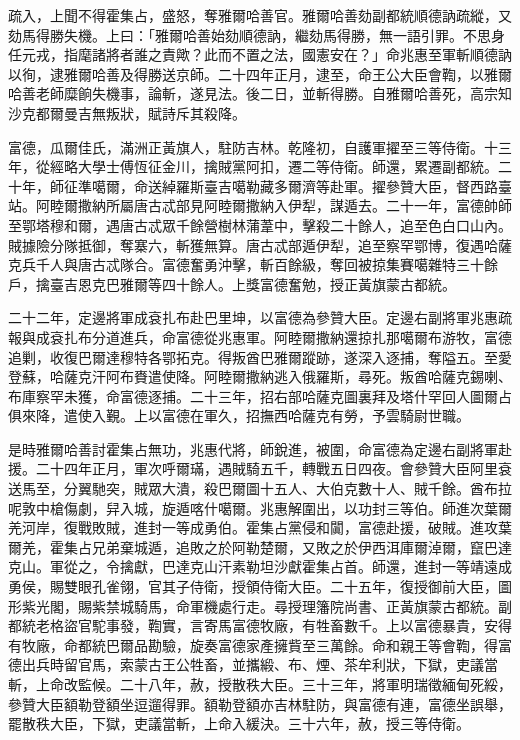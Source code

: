 \begin{pinyinscope}
疏入，上聞不得霍集占，盛怒，奪雅爾哈善官。雅爾哈善劾副都統順德訥疏縱，又劾馬得勝失機。上曰：「雅爾哈善始劾順德訥，繼劾馬得勝，無一語引罪。不思身任元戎，指麾諸將者誰之責歟？此而不置之法，國憲安在？」命兆惠至軍斬順德訥以徇，逮雅爾哈善及得勝送京師。二十四年正月，逮至，命王公大臣會鞫，以雅爾哈善老師糜餉失機事，論斬，遂見法。後二日，並斬得勝。自雅爾哈善死，高宗知沙克都爾曼吉無叛狀，賦詩斥其殺降。

富德，瓜爾佳氏，滿洲正黃旗人，駐防吉林。乾隆初，自護軍擢至三等侍衛。十三年，從經略大學士傅恆征金川，擒賊黨阿扣，遷二等侍衛。師還，累遷副都統。二十年，師征準噶爾，命送綽羅斯臺吉噶勒藏多爾濟等赴軍。擢參贊大臣，督西路臺站。阿睦爾撒納所屬唐古忒部見阿睦爾撒納入伊犁，謀遁去。二十一年，富德帥師至鄂塔穆和爾，遇唐古忒眾千餘營樹林蒲葦中，擊殺二十餘人，追至色白口山內。賊據險分隊抵御，奪寨六，斬獲無算。唐古忒部遁伊犁，追至察罕鄂博，復遇哈薩克兵千人與唐古忒隊合。富德奮勇沖擊，斬百餘級，奪回被掠集賽噶雜特三十餘戶，擒臺吉恩克巴雅爾等四十餘人。上獎富德奮勉，授正黃旗蒙古都統。

二十二年，定邊將軍成袞扎布赴巴里坤，以富德為參贊大臣。定邊右副將軍兆惠疏報與成袞扎布分道進兵，命富德從兆惠軍。阿睦爾撒納還掠扎那噶爾布游牧，富德追剿，收復巴爾達穆特各鄂拓克。得叛酋巴雅爾蹤跡，遂深入逐捕，奪隘五。至愛登蘇，哈薩克汗阿布賚遣使降。阿睦爾撒納逃入俄羅斯，尋死。叛酋哈薩克錫喇、布庫察罕未獲，命富德逐捕。二十三年，招右部哈薩克圖裏拜及塔什罕回人圖爾占俱來降，遣使入覲。上以富德在軍久，招撫西哈薩克有勞，予雲騎尉世職。

是時雅爾哈善討霍集占無功，兆惠代將，師銳進，被圍，命富德為定邊右副將軍赴援。二十四年正月，軍次呼爾璊，遇賊騎五千，轉戰五日四夜。會參贊大臣阿里袞送馬至，分翼馳突，賊眾大潰，殺巴爾圖十五人、大伯克數十人、賊千餘。酋布拉呢敦中槍傷劇，舁入城，旋遁喀什噶爾。兆惠解圍出，以功封三等伯。師進次葉爾羌河岸，復戰敗賊，進封一等成勇伯。霍集占黨侵和闐，富德赴援，破賊。進攻葉爾羌，霍集占兄弟棄城遁，追敗之於阿勒楚爾，又敗之於伊西洱庫爾淖爾，竄巴達克山。軍從之，令擒獻，巴達克山汗素勒坦沙獻霍集占首。師還，進封一等靖遠成勇侯，賜雙眼孔雀翎，官其子侍衛，授領侍衛大臣。二十五年，復授御前大臣，圖形紫光閣，賜紫禁城騎馬，命軍機處行走。尋授理籓院尚書、正黃旗蒙古都統。副都統老格盜官駝事發，鞫實，言寄馬富德牧廠，有牲畜數千。上以富德暴貴，安得有牧廠，命都統巴爾品勘驗，旋奏富德家產擁貲至三萬餘。命和親王等會鞫，得富德出兵時留官馬，索蒙古王公牲畜，並攜緞、布、煙、茶牟利狀，下獄，吏議當斬，上命改監候。二十八年，赦，授散秩大臣。三十三年，將軍明瑞徵緬甸死綏，參贊大臣額勒登額坐逗遛得罪。額勒登額亦吉林駐防，與富德有連，富德坐誤舉，罷散秩大臣，下獄，吏議當斬，上命入緩決。三十六年，赦，授三等侍衛。


\end{pinyinscope}
